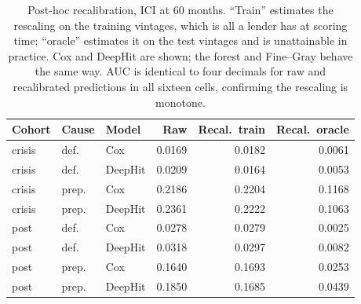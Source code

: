 \begin{table}[t]
\caption{Post-hoc recalibration, ICI at 60 months. ``Train'' estimates the rescaling on the training vintages, which is all a lender has at scoring time; ``oracle'' estimates it on the test vintages and is unattainable in practice. Cox and DeepHit are shown; the forest and Fine--Gray behave the same way. AUC is identical to four decimals for raw and recalibrated predictions in all sixteen cells, confirming the rescaling is monotone.}
\label{tab:recal}
\centering\footnotesize
\setlength{\tabcolsep}{4pt}
\begin{tabular}{@{}lllrrr@{}}
\toprule
Cohort & Cause & Model & Raw & Recal.\ train & Recal.\ oracle \\
\midrule
crisis & def. & Cox & 0.0169 & 0.0182 & 0.0061 \\
crisis & def. & DeepHit & 0.0209 & 0.0164 & 0.0053 \\
crisis & prep. & Cox & 0.2186 & 0.2204 & 0.1168 \\
crisis & prep. & DeepHit & 0.2361 & 0.2222 & 0.1063 \\
post & def. & Cox & 0.0278 & 0.0279 & 0.0025 \\
post & def. & DeepHit & 0.0318 & 0.0297 & 0.0082 \\
post & prep. & Cox & 0.1640 & 0.1693 & 0.0253 \\
post & prep. & DeepHit & 0.1850 & 0.1685 & 0.0439 \\
\bottomrule
\end{tabular}
\end{table}

